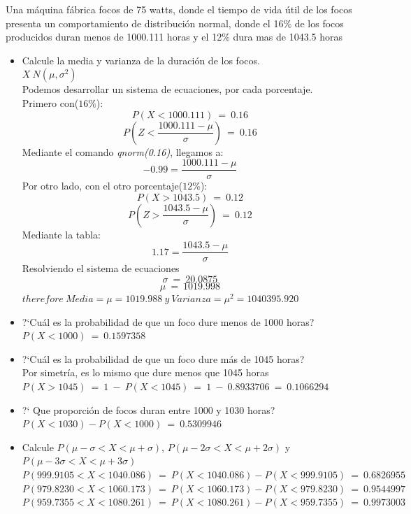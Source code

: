 Una m\'aquina f\'abrica focos de 75 watts, donde el tiempo de vida \'util de los focos presenta un comportamiento de distribuci\'on
normal, donde el 16\% de los focos producidos duran menos de 1000.111 horas y el 12\% dura mas de 1043.5 horas
\begin{itemize}
	\item Calcule la media y varianza de la duraci\'on de los focos.\\
		$X~N(\mu,\sigma^{2})$\\
		Podemos desarrollar un sistema de ecuaciones, por cada porcentaje.\\
		Primero con($16\%$):\\
		$$P(X<1000.111)\ =\ 0.16$$
		$$P(Z<\frac{1000.111-\mu}{\sigma})\ =\ 0.16$$
		Mediante el comando \emph{qnorm(0.16)}, llegamos a:\\
		$$-0.99=\frac{1000.111-\mu}{\sigma}$$
		Por otro lado, con el otro porcentaje($12\%$):\\
		$$P(X>1043.5)\ =\ 0.12$$
		$$P(Z>\frac{1043.5-\mu}{\sigma})\ =\ 0.12$$
		Mediante la tabla:\\
		$$1.17=\frac{1043.5-\mu}{\sigma}$$
		Resolviendo el sistema de ecuaciones\\
		$$\sigma\ =\ 20.0875$$
		$$\mu\ =\ 1019.998$$
		$therefore\ Media=\mu=1019.988\ y\ Varianza=\mu^{2}=1040395.920 $\\
	\item ?`Cu\'al es la probabilidad de que un foco dure menos de 1000 horas?\\
		$P(X<1000)\ =\ 0.1597358\ $\\ %
	
	\item ?`Cu\'al es la probabilidad de que un foco dure m\'as de 1045 horas?\\
		Por simetr\'ia, es lo mismo que dure menos que 1045 horas\\
		$P(X>1045)\ =\ 1\ -\ P(X<1045)\ =\ 1\ -\  0.8933706\ =\ 0.1066294$\\ %
	\item ?` Que proporci\'on de focos duran entre 1000 y 1030 horas?\\
		$P(X<1030)-P(X<1000)\ =\ 0.5309946$\\
		
	\item Calcule $P(\mu - \sigma < X < \mu + \sigma)$, $P(\mu - 2\sigma < X < \mu + 2\sigma)$ y $P(\mu - 3\sigma < X < \mu + 3\sigma)$\\
		$P(999.9105 < X < 1040.086)\ =\ P(X<1040.086)-P(X<999.9105)\ =\ 0.6826955$\\
		$P(979.8230 < X < 1060.173)\ =\ P(X<1060.173)-P(X<979.8230)\ =\ 0.9544997$\\
		$P(959.7355 < X < 1080.261)\ =\ P(X<1080.261)-P(X<959.7355)\ =\ 0.9973003$\\


\end{itemize}
